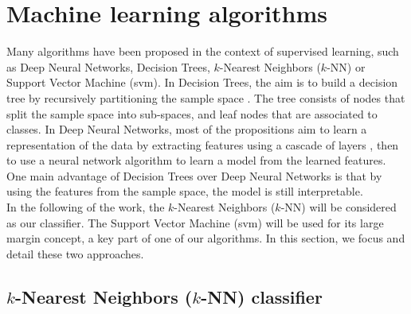 \newpage
\section{Machine learning algorithms}

Many algorithms have been proposed in the context of supervised learning, such as Deep Neural Networks, Decision Trees, $k$-Nearest Neighbors ($k$-NN) or Support Vector Machine ({\sc svm}). In Decision Trees, the aim is to build a decision tree by recursively partitioning the sample space \cite{Quinlan1986a}. The tree consists of nodes that split the sample space into sub-spaces, and leaf nodes that are associated to classes. In Deep Neural Networks, most of the propositions aim to learn a representation of the data by extracting features using a cascade of layers \cite{Lee2009}, then to use a neural network algorithm to learn a model from the learned features. One main advantage of Decision Trees over Deep Neural Networks is that by using the features from the sample space, the model is still interpretable. \\
In the following of the work, the $k$-Nearest Neighbors ($k$-NN) will be considered as our classifier. The Support Vector Machine ({\sc svm}) will be used for its large margin concept, a key part of one of our algorithms. In this section, we focus and detail these two approaches. 


\subsection{$k$-Nearest Neighbors ($k$-NN) classifier}
\label{sec:kNN}

